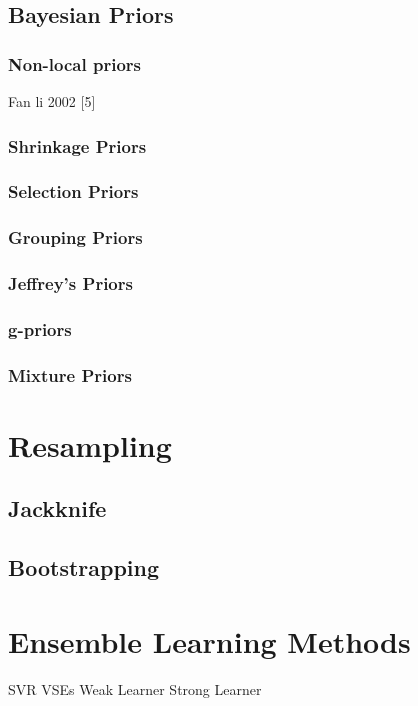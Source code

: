 \subsection{Bayesian Priors}
\subsubsection{Non-local priors}
Fan li 2002 [5]
\subsubsection{Shrinkage Priors}
\subsubsection{Selection Priors}
\subsubsection{Grouping Priors}
\subsubsection{Jeffrey's Priors}
\subsubsection{g-priors}
\subsubsection{Mixture Priors}

\section{Resampling}
\subsection{Jackknife}
\subsection{Bootstrapping}

\section{Ensemble Learning Methods}
SVR
VSEs
Weak Learner
Strong Learner
